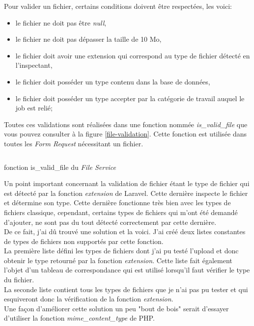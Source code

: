 \documentclass[
    iai, %
    il, %
]{heig-tb}
\begin{document}
Pour valider un fichier, certains conditions doivent être respectées, les voici:
\begin{itemize}
    \item le fichier ne doit pas être \emph{null},
    \item le fichier ne doit pas dépasser la taille de 10 Mo,
    \item le fichier doit avoir une extension qui correspond au type de fichier détecté en l'inspectant,
    \item le fichier doit posséder un type contenu dans la base de données,
    \item le fichier doit posséder un type accepter par la catégorie de travail auquel le job est relié;
\end{itemize}

Toutes ces validations sont réalisées dans une fonction nommée \emph{is\_valid\_file} que vous pouvez consulter à la figure \ref{file-validation}. Cette fonction est utilisée dans toutes les \emph{Form Request} nécessitant un fichier.

\begin{listing}[h]
    \inputminted{php}{assets/code/FileValidation.php}
    \caption{fonction is\_valid\_file du \emph{File Service} \label{file-validation}}
\end{listing}

Un point important concernant la validation de fichier étant le type de fichier qui est détecté par la fonction \emph{extension} de Laravel. Cette dernière inspecte le fichier et détermine son type. Cette dernière fonctionne très bien avec les types de fichiers classique, cependant, certains types de fichiers qui m'ont été demandé d'ajouter, ne sont pas du tout détecté correctement par cette dernière. \\
De ce fait, j'ai dû trouvé une solution et la voici. J'ai créé deux listes constantes de types de fichiers non supportés par cette fonction. \\
La première liste défini les types de fichiers dont j'ai pu testé l'upload et donc obtenir le type retourné par la fonction \emph{extension}. Cette liste fait également l'objet d'un tableau de correspondance qui est utilisé lorsqu'il faut vérifier le type du fichier. \\
La seconde liste contient tous les types de fichiers que je n'ai pas pu tester et qui esquiveront donc la vérification de la fonction \emph{extension}. \\
Une façon d'améliorer cette solution un peu "bout de bois" serait d'essayer d'utiliser la fonction \emph{mime\_content\_type} de PHP.
\end{document}
